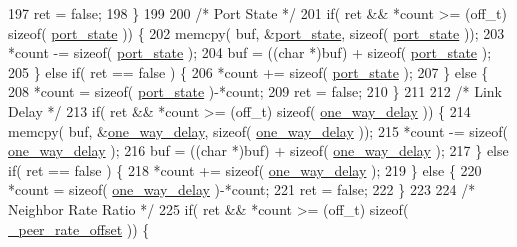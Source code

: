 \begin{DoxyCode}
197         ret = \textcolor{keyword}{false};
198     \}
199 
200     \textcolor{comment}{/* Port State */}
201     \textcolor{keywordflow}{if}( ret && *count >= (off\_t) \textcolor{keyword}{sizeof}( \hyperlink{class_common_port_ae66554126902ed959a3b296ddd3204e8}{port\_state} )) \{
202         memcpy( buf, &\hyperlink{class_common_port_ae66554126902ed959a3b296ddd3204e8}{port\_state}, \textcolor{keyword}{sizeof}( \hyperlink{class_common_port_ae66554126902ed959a3b296ddd3204e8}{port\_state} ));
203         *count -= \textcolor{keyword}{sizeof}( \hyperlink{class_common_port_ae66554126902ed959a3b296ddd3204e8}{port\_state} );
204         buf = ((\textcolor{keywordtype}{char} *)buf) + \textcolor{keyword}{sizeof}( \hyperlink{class_common_port_ae66554126902ed959a3b296ddd3204e8}{port\_state} );
205     \} \textcolor{keywordflow}{else} \textcolor{keywordflow}{if}( ret == \textcolor{keyword}{false} ) \{
206         *count += \textcolor{keyword}{sizeof}( \hyperlink{class_common_port_ae66554126902ed959a3b296ddd3204e8}{port\_state} );
207     \} \textcolor{keywordflow}{else} \{
208         *count = \textcolor{keyword}{sizeof}( \hyperlink{class_common_port_ae66554126902ed959a3b296ddd3204e8}{port\_state} )-*count;
209         ret = \textcolor{keyword}{false};
210     \}
211 
212     \textcolor{comment}{/* Link Delay */}
213     \textcolor{keywordflow}{if}( ret && *count >= (off\_t) \textcolor{keyword}{sizeof}( \hyperlink{class_common_port_ac6f52fcdc0bbe5e322f5435e494bb827}{one\_way\_delay} )) \{
214         memcpy( buf, &\hyperlink{class_common_port_ac6f52fcdc0bbe5e322f5435e494bb827}{one\_way\_delay}, \textcolor{keyword}{sizeof}( \hyperlink{class_common_port_ac6f52fcdc0bbe5e322f5435e494bb827}{one\_way\_delay} ));
215         *count -= \textcolor{keyword}{sizeof}( \hyperlink{class_common_port_ac6f52fcdc0bbe5e322f5435e494bb827}{one\_way\_delay} );
216         buf = ((\textcolor{keywordtype}{char} *)buf) + \textcolor{keyword}{sizeof}( \hyperlink{class_common_port_ac6f52fcdc0bbe5e322f5435e494bb827}{one\_way\_delay} );
217     \} \textcolor{keywordflow}{else} \textcolor{keywordflow}{if}( ret == \textcolor{keyword}{false} ) \{
218         *count += \textcolor{keyword}{sizeof}( \hyperlink{class_common_port_ac6f52fcdc0bbe5e322f5435e494bb827}{one\_way\_delay} );
219     \} \textcolor{keywordflow}{else} \{
220         *count = \textcolor{keyword}{sizeof}( \hyperlink{class_common_port_ac6f52fcdc0bbe5e322f5435e494bb827}{one\_way\_delay} )-*count;
221         ret = \textcolor{keyword}{false};
222     \}
223 
224     \textcolor{comment}{/* Neighbor Rate Ratio */}
225     \textcolor{keywordflow}{if}( ret && *count >= (off\_t) \textcolor{keyword}{sizeof}( \hyperlink{class_common_port_a43c379422577226fdb4f3d0992c3bcea}{\_peer\_rate\_offset} )) \{

\end{DoxyCode}
